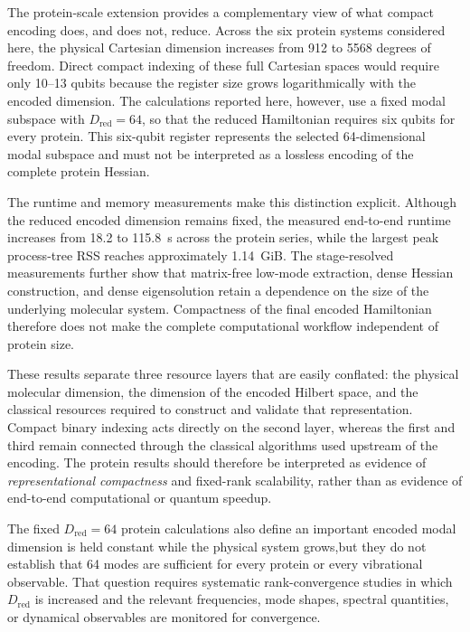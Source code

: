 \documentclass[aip,jcp,reprint,amsmath,amssymb,floatfix]{revtex4-2}
\begin{document}
The protein-scale extension provides a complementary view of what compact encoding does, and does not, reduce. Across the six protein systems considered here, the physical Cartesian dimension increases from 912 to 5568 degrees of freedom. Direct compact indexing of these full Cartesian spaces would require only 10--13 qubits because the register size grows logarithmically with the encoded dimension. The calculations reported here, however, use a fixed modal subspace with $D_{\text{red}} = 64$, so that the reduced Hamiltonian requires six qubits for every protein. This six-qubit register represents the selected 64-dimensional modal subspace and must not be interpreted as a lossless encoding of the complete protein Hessian.

The runtime and memory measurements make this distinction explicit. Although
the reduced encoded dimension remains fixed, the measured end-to-end runtime
increases from 18.2 to 115.8~s across the protein series, while the largest
peak process-tree RSS reaches approximately 1.14~GiB. The stage-resolved
measurements further show that matrix-free low-mode extraction, dense Hessian
construction, and dense eigensolution retain a dependence on the size of the
underlying molecular system. Compactness of the final encoded Hamiltonian
therefore does not make the complete computational workflow independent of
protein size.

These results separate three resource layers that are easily conflated:
the physical molecular dimension, the dimension of the encoded Hilbert
space, and the classical resources required to construct and validate that
representation. Compact binary indexing acts directly on the second layer,
whereas the first and third remain connected through the classical
algorithms used upstream of the encoding. The protein results should
therefore be interpreted as evidence of \emph{representational compactness}
and fixed-rank scalability, rather than as evidence of end-to-end
computational or quantum speedup.

The fixed $D_{\mathrm{red}}=64$ protein calculations also define an 
important encoded modal dimension is held constant while the physical system 
grows,but they do not establish that 64 modes are sufficient for every protein
or every vibrational observable. That question requires systematic rank-convergence
studies in which $D_{\mathrm{red}}$ is increased and the relevant frequencies,
mode shapes, spectral quantities, or dynamical observables are monitored for convergence.
\end{document}

